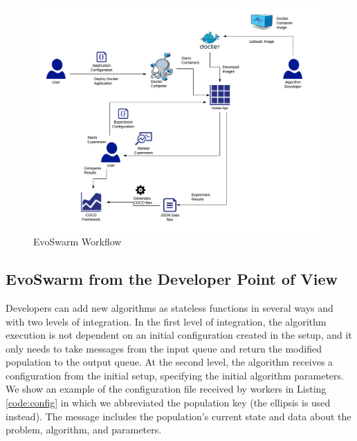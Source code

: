 \documentclass[review]{elsarticle}
\begin{document}
\begin{figure}
    \centering
    \includegraphics[width=\textwidth]{experiment_flow}
    \caption{EvoSwarm Workflow}
    \label{fig:experiment_flow}
\end{figure}

\subsection{EvoSwarm from the Developer Point of View} 

Developers can add new algorithms as stateless functions in
several ways and with two levels of integration. In the first level of
integration, the algorithm execution is not dependent on an initial
configuration created in the setup, and it only needs to take messages from the
input queue and return the modified population to the output queue. At the
second level, the algorithm receives a configuration from the initial setup,
specifying the initial algorithm parameters. We show an example of the configuration
file received by workers in Listing \ref{code:config}  in which we abbreviated
the population key (the ellipsis is used instead). The message includes the 
population's current state and data about the problem, algorithm, and parameters. 
\end{document}
